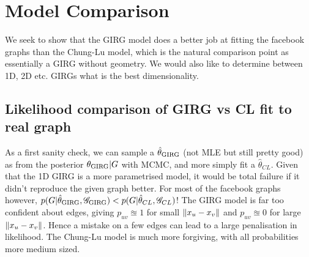 \section{Model Comparison}

We seek to show that the GIRG model does a better job at fitting the facebook graphs than the Chung-Lu model, which is the natural comparison point as essentially a GIRG without geometry. We would also like to determine between 1D, 2D etc. GIRGs what is the best dimensionality.

\subsection{Likelihood comparison of GIRG vs CL fit to real graph}
As a first sanity check, we can sample a $\hat{\theta}_{\mathrm{GIRG}}$ (not MLE but still pretty good) as from the posterior $\theta_{\mathrm{GIRG}} | G$ with MCMC, and more simply fit a $\hat{\theta}_{CL}$. Given that the 1D GIRG is a more parametrised model, it would be total failure if it didn't reproduce the given graph better. For most of the facebook graphs however, $p(G | \hat{\theta}_{\mathrm{GIRG}}, \mathscr{G}_{\mathrm{GIRG}}) < p(G | \hat{\theta}_{CL}, \mathscr{G}_{CL})$!
The GIRG model is far too confident about edges, giving $p_{uv} \approxeq 1$ for small $\left\lVert x_u - x_v\right\rVert$ and $p_{uv} \approxeq 0$ for large $\left\lVert x_u - x_v\right\rVert$. Hence a mistake on a few edges can lead to a large penalisation in likelihood. The Chung-Lu model is much more forgiving, with all probabilities more medium sized. 

